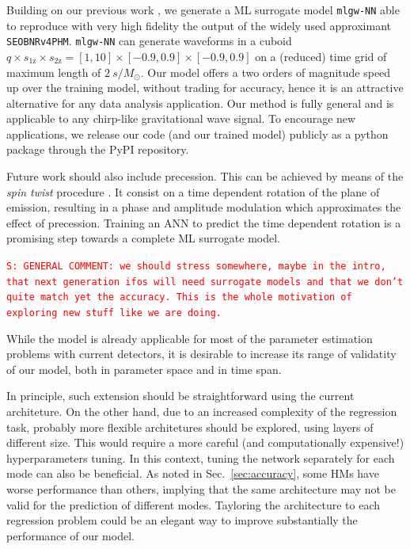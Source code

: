 \documentclass[twocolumn,showpacs,preprintnumbers,nofootinbib,prd,
superscriptaddress,10pt]{revtex4-1}
\newcommand{\stefano}[1]{{\textcolor{red}{\texttt{S: #1}} }}
\begin{document}
{Building on our previous work \cite{Schmidt:2020yuu}, we generate a ML surrogate model \texttt{mlgw-NN} able to reproduce with very high fidelity the output of the widely used approximant \texttt{SEOBNRv4PHM}. \texttt{mlgw-NN} can generate waveforms in a cuboid $q\times s_\text{1z} \times s_\text{2z} = [1,10]\times[-0.9,0.9]\times[-0.9,0.9]$ on a (reduced) time grid of maximum length of $\SI{2}{s/M_\odot}$.
Our model offers a two orders of magnitude speed up over the training model, without trading for accuracy, hence it is an attractive alternative for any data analysis application.
Our method is fully general and is applicable to any chirp-like gravitational wave signal.
To encourage new applications, we release our code (and our trained model) publicly as a python package through the PyPI repository.

Future work should also include precession. This can be achieved by means of the {\it spin twist} procedure \cite{}. It consist on a time dependent rotation of the plane of emission, resulting in a phase and amplitude modulation which approximates the effect of precession.
Training an ANN to predict the time dependent rotation is a promising step towards a complete ML surrogate model.

\stefano{GENERAL COMMENT: we should stress somewhere, maybe in the intro, that next generation ifos will need surrogate models and that we don't quite match yet the accuracy. This is the whole motivation of exploring new stuff like we are doing.}

While the model is already applicable for most of the parameter estimation problems with current detectors, it is desirable to increase its range of validatity of our model, both in parameter space and in time span.

In principle, such extension should be straightforward using the current architeture. On the other hand, due to an increased complexity of the regression task, probably more flexible architetures should be explored, using layers of different size. This would require a more careful (and computationally expensive!) hyperparameters tuning.
In this context, tuning the network separately for each mode can also be beneficial. As noted in Sec.~\ref{sec:accuracy}, some HMs have worse performance than others, implying that the same architecture may not be valid for the prediction of different modes.
Tayloring the architecture to each regression problem could be an elegant way to improve substantially the performance of our model.

}
\end{document}
